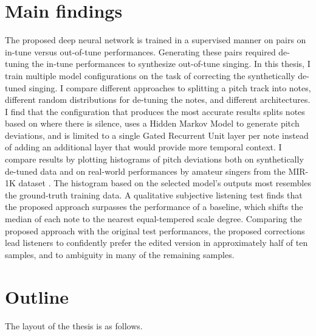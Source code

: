 \section{Main findings}
The proposed deep neural network is trained in a supervised manner on pairs on in-tune versus out-of-tune performances. Generating these pairs required de-tuning the in-tune performances to synthesize out-of-tune singing. In this thesis, I train multiple model configurations on the task of correcting the synthetically de-tuned singing. I compare different approaches to splitting a pitch track into notes, different random distributions for de-tuning the notes, and different architectures. I find that the configuration that produces the most accurate results splits notes based on where there is silence, uses a Hidden Markov Model \cite{rabiner1989tutorial} to generate pitch deviations, and is limited to a single Gated Recurrent Unit \cite{chung2014empirical} layer per note instead of adding an additional layer that would provide more temporal context. I compare results by plotting histograms of pitch deviations both on synthetically de-tuned data and on real-world performances by amateur singers from the MIR-1K dataset \cite{hsu2009improvement}. The histogram based on the selected model's outputs most resembles the ground-truth training data. A qualitative subjective listening test finds that the proposed approach surpasses the performance of a baseline, which shifts the median of each note to the nearest equal-tempered scale degree. Comparing the proposed approach with the original test performances, the proposed corrections lead listeners to confidently prefer the edited version in approximately half of ten samples, and to ambiguity in many of the remaining samples.


\section{Outline}
The layout of the thesis is as follows.

